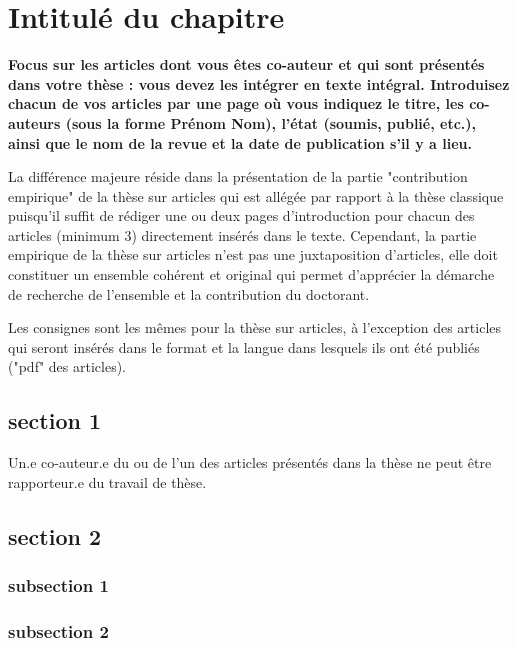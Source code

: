 \chapter{Intitulé du chapitre}


\startcontents[chapters]

\textbf{Focus sur les articles dont vous êtes co-auteur et qui sont présentés dans votre thèse : vous devez les intégrer en texte intégral.
Introduisez chacun de vos articles par une page où vous indiquez le titre, les co-auteurs (sous la forme Prénom Nom), l’état (soumis, publié, etc.), ainsi que le nom de la revue et la date de publication s'il y a lieu.}


La différence majeure réside dans la présentation de la partie "contribution empirique" de la thèse sur articles qui est allégée par rapport à la thèse classique puisqu’il suffit de rédiger une ou deux pages d'introduction pour chacun des articles (minimum 3) directement insérés dans le texte. Cependant, la partie empirique de la thèse sur articles n'est pas une juxtaposition d'articles, elle doit constituer un ensemble cohérent et original qui permet d'apprécier la démarche de recherche de l'ensemble et la contribution du doctorant.


Les consignes sont les mêmes pour la thèse sur articles, à l'exception des articles qui seront insérés
dans le format et la langue dans lesquels ils ont été publiés ("pdf" des articles).

\section{section 1}

Un.e co-auteur.e du ou de l'un des articles présentés dans la thèse ne peut être rapporteur.e du travail de thèse.


\section{section 2}
\lipsum[2]

\subsection{subsection 1}
\lipsum[1]
\subsection{subsection 2}
\lipsum[1]